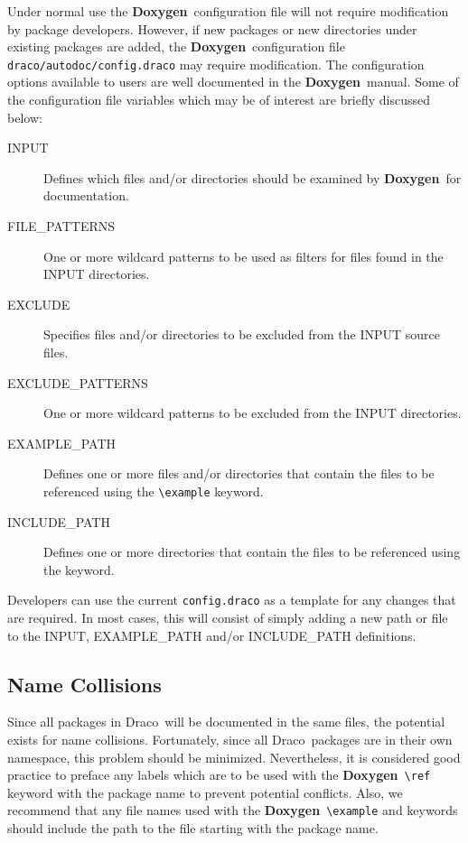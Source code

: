 \documentclass[11pt]{nmemo}
\newcommand{\draco}{{\normalfont\sffamily Draco}}
\newcommand{\doxy}{{\normalfont\bfseries Doxygen}}
\begin{document}
Under normal use the \doxy\ configuration file will not require
modification by package developers. However, if new packages or
new directories under existing packages are added,
the \doxy\ configuration file \texttt{draco/autodoc/config.draco}
may require modification.
The configuration options available to users are well
documented in the \doxy\ manual. Some of the configuration file 
variables which may be of interest are briefly discussed below:
\begin{description}
\item[\ttfamily INPUT] Defines which files and/or
  directories should be  examined by \doxy\ for documentation.  
\item [\ttfamily FILE\_PATTERNS] One or more wildcard patterns to be
  used as filters for files found in the INPUT directories. 
\item [\ttfamily EXCLUDE] Specifies files and/or directories to be
   excluded from the INPUT source files.
\item [\ttfamily EXCLUDE\_PATTERNS] One or more wildcard patterns to be
  excluded from the INPUT directories.
\item [\ttfamily EXAMPLE\_PATH] Defines one or more files and/or
  directories that contain the files to be referenced using
  the \verb+\example+ keyword.
\item [\ttfamily INCLUDE\_PATH] Defines one or more 
  directories that contain the files to be referenced using the
 \verb++ keyword.
\end{description}

Developers can use the current \texttt{config.draco} as a template for
any changes that are required. In most cases, this will consist of
simply adding a new path or file to the INPUT, EXAMPLE\_PATH and/or 
INCLUDE\_PATH definitions.

\subsection{Name Collisions}
Since all packages in \draco\ will be documented in the same
files, the potential exists for name collisions. Fortunately,
since all \draco\ packages are in their own namespace, this problem
should be minimized. Nevertheless, 
    it is considered good practice  to preface any labels which are to be
used with the \doxy\ \verb+\ref+ keyword with the
    package name to prevent potential conflicts.
Also, we recommend that any file names used
with the \doxy\ \verb+\example+ and \verb++ keywords
should include the path to the file starting with the package name.
\end{document}
